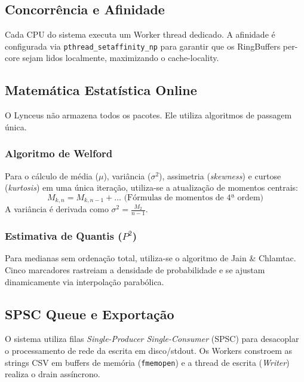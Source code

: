 \documentclass[a4paper,12pt]{article}
\begin{document}
\subsection{Concorrência e Afinidade}
Cada CPU do sistema executa um Worker thread dedicado. A afinidade é configurada via \texttt{pthread\_setaffinity\_np} para garantir que os RingBuffers per-core sejam lidos localmente, maximizando o cache-locality.

\subsection{Matemática Estatística Online}
O Lynceus não armazena todos os pacotes. Ele utiliza algoritmos de passagem única.

\subsubsection{Algoritmo de Welford}
Para o cálculo de média ($\mu$), variância ($\sigma^2$), assimetria (\textit{skewness}) e curtose (\textit{kurtosis}) em uma única iteração, utiliza-se a atualização de momentos centrais:
\[
M_{k,n} = M_{k,n-1} + \dots \text{ (Fórmulas de momentos de 4ª ordem)}
\]
A variância é derivada como $\sigma^2 = \frac{M_2}{n-1}$.

\subsubsection{Estimativa de Quantis ($P^2$)}
Para medianas sem ordenação total, utiliza-se o algoritmo de Jain \& Chlamtac. Cinco marcadores rastreiam a densidade de probabilidade e se ajustam dinamicamente via interpolação parabólica.

\subsection{SPSC Queue e Exportação}
O sistema utiliza filas \textit{Single-Producer Single-Consumer} (SPSC) para desacoplar o processamento de rede da escrita em disco/stdout. Os Workers constroem as strings CSV em buffers de memória (\texttt{fmemopen}) e a thread de escrita (\textit{Writer}) realiza o drain assíncrono.
\end{document}
